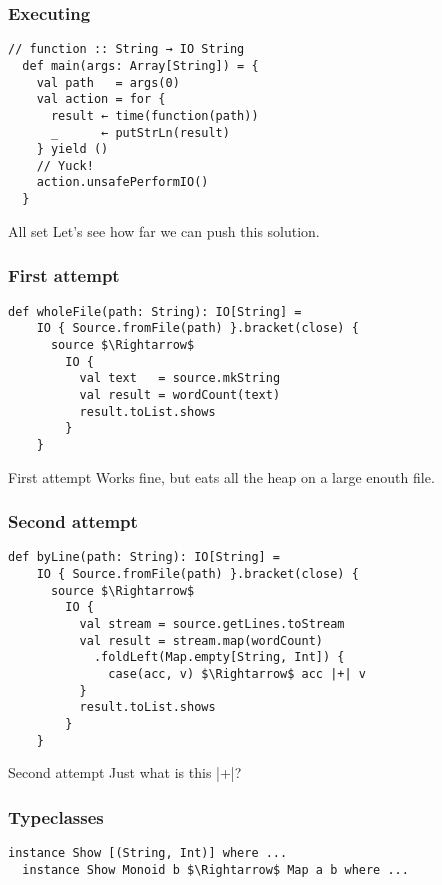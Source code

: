 \documentclass{beamer}
\begin{document}
\begin{frame}[fragile]
\frametitle{Executing}
\begin{lstlisting}[mathescape]
  // function :: String → IO String
  def main(args: Array[String]) = {
    val path   = args(0)
    val action = for {
      result ← time(function(path))
      _      ← putStrLn(result)
    } yield ()
    // Yuck!
    action.unsafePerformIO()
  }
\end{lstlisting}
\end{frame}

\begin{frame}{All set}
  Let's see how far we can push this solution.
\end{frame}

\begin{frame}[fragile]
\frametitle{First attempt}
\begin{lstlisting}[mathescape]
  def wholeFile(path: String): IO[String] =
    IO { Source.fromFile(path) }.bracket(close) {
      source $\Rightarrow$
        IO {
          val text   = source.mkString
          val result = wordCount(text)
          result.toList.shows
        }
    }
\end{lstlisting}
\end{frame}

\begin{frame}{First attempt}
  Works fine, but eats all the heap on a large enouth file.
\end{frame}

\begin{frame}[fragile]
\frametitle{Second attempt}
\begin{lstlisting}[mathescape]
  def byLine(path: String): IO[String] =
    IO { Source.fromFile(path) }.bracket(close) {
      source $\Rightarrow$
        IO {
          val stream = source.getLines.toStream
          val result = stream.map(wordCount)
            .foldLeft(Map.empty[String, Int]) {
              case(acc, v) $\Rightarrow$ acc |+| v
          }
          result.toList.shows
        }
    }
\end{lstlisting}
\end{frame}

\begin{frame}{Second attempt}
  Just what is this |+|?
\end{frame}

\begin{frame}[fragile]
\frametitle{Typeclasses}
\begin{lstlisting}[mathescape]
  instance Show [(String, Int)] where ...
  instance Show Monoid b $\Rightarrow$ Map a b where ...
\end{lstlisting}
\end{frame}
\end{document}
